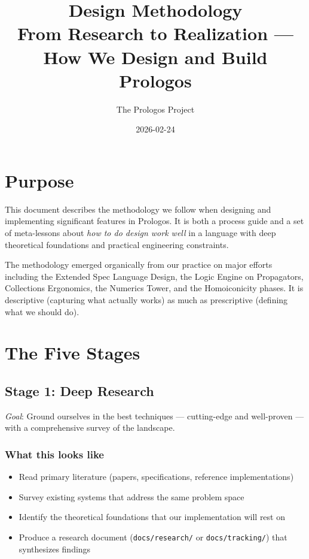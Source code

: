 \documentclass[11pt]{article}
\author{The Prologos Project}
\date{2026-02-24}
\title{Design Methodology\\\medskip
\large From Research to Realization — How We Design and Build Prologos}
\begin{document}
\maketitle
\tableofcontents

\section{Purpose}
\label{sec:org38268c4}

This document describes the methodology we follow when designing and
implementing significant features in Prologos. It is both a process guide
and a set of meta-lessons about \emph{how to do design work well} in a language
with deep theoretical foundations and practical engineering constraints.

The methodology emerged organically from our practice on major efforts
including the Extended Spec Language Design, the Logic Engine on
Propagators, Collections Ergonomics, the Numerics Tower, and the
Homoiconicity phases. It is descriptive (capturing what actually works)
as much as prescriptive (defining what we should do).
\section{The Five Stages}
\label{sec:org018db5b}

\subsection{Stage 1: Deep Research}
\label{sec:org29a7a1b}

\emph{Goal}: Ground ourselves in the best techniques --- cutting-edge and
well-proven --- with a comprehensive survey of the landscape.
\subsubsection{What this looks like}
\label{sec:org9715882}

\begin{itemize}
\item Read primary literature (papers, specifications, reference implementations)
\item Survey existing systems that address the same problem space
\item Identify the theoretical foundations that our implementation will rest on
\item Produce a research document (\texttt{docs/research/} or \texttt{docs/tracking/}) that
synthesizes findings
\end{itemize}
\end{document}
